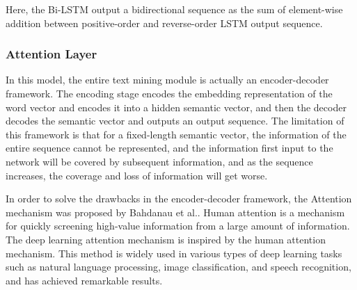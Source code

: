 Here, the Bi-LSTM output a bidirectional sequence as the sum of element-wise addition between positive-order and reverse-order LSTM output sequence.

\subsubsection{Attention Layer}




In this model, the entire text mining module is actually an encoder-decoder framework. The encoding stage encodes the embedding representation of the word vector and encodes it into a hidden semantic vector, and then the decoder decodes the semantic vector and outputs an output sequence. The limitation of this framework is that for a fixed-length semantic vector, the information of the entire sequence cannot be represented, and the information first input to the network will be covered by subsequent information, and as the sequence increases, the coverage and loss of information will get worse.

In order to solve the drawbacks in the encoder-decoder framework, the Attention mechanism was proposed by Bahdanau et al.\cite{bahdanau2014neural}. Human attention is a mechanism for quickly screening high-value information from a large amount of information. The deep learning attention mechanism is inspired by the human attention mechanism. This method is widely used in various types of deep learning tasks such as natural language processing\cite{hu2019introductory}, image classification\cite{fu2017look,sun2018multi}, and speech recognition\cite{chorowski2015attention}, and has achieved remarkable results.

